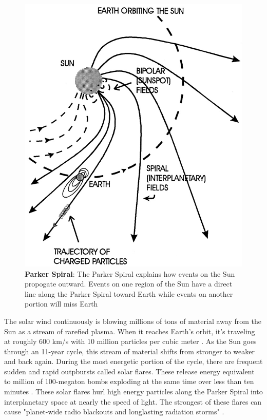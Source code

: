 \documentclass[twoside]{report}
\begin{document}
\begin{figure}[ht]
  \begin{center}
    \includegraphics[scale=0.6]{parkerspiral}
    \caption{{\bf Parker Spiral}: The Parker Spiral explains how events on the Sun propogate outward. Events on one region of the Sun have a direct line along the Parker Spiral toward Earth while events on another portion will miss Earth \cite{spiralimage}}
    \label{fig:parkerspiral}
 \end{center}
\end{figure}

The solar wind continuously is blowing millions of tons of material away from the Sun as a stream of rarefied plasma. When it reaches Earth's orbit, it's traveling at roughly 600 km/s  with 10 million particles per cubic meter \cite[p. 67]{langbook}. As the Sun goes through an 11-year cycle, this stream of material shifts from stronger to weaker and back again. During the most energetic portion of the cycle, there are frequent sudden and rapid outpbursts called solar flares. These release energy equivalent to million of 100-megaton bombs exploding at the same time over less than ten minutes \cite[p. 89]{langbook}. These solar flares hurl high energy particles along the Parker Spiral into interplanetary space at nearly the speed of light. The strongest of these flares can cause "planet-wide radio blackouts and longlasting radiation storms" \cite[p. 255]{langbook}. 
\end{document}
